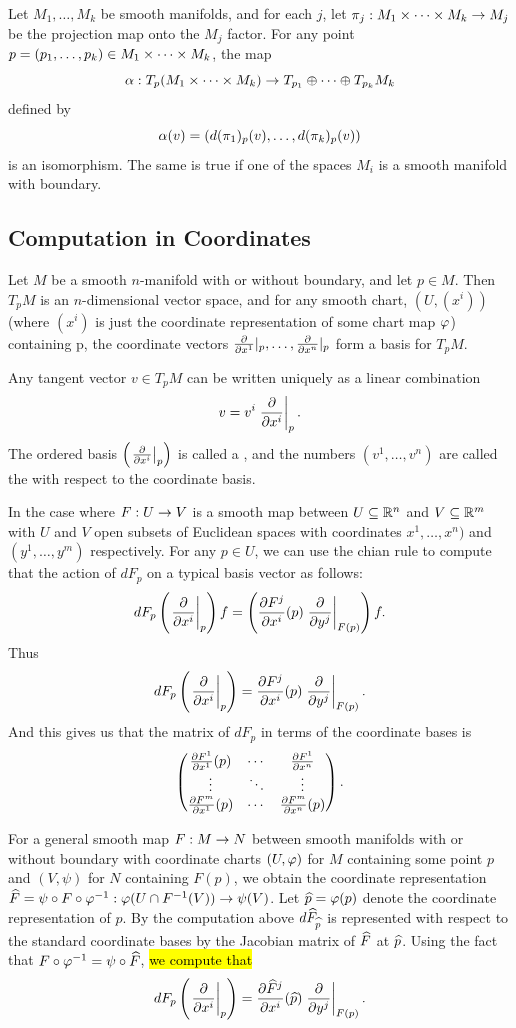 \begin{prop}
Let $M_1,\ldots,M_k$ be smooth manifolds, and for each $j$, let $\pi_j:M_1\times\cdots\times M_k\rightarrow M_j$ be the projection map onto the $M_j$ factor. For any point $p = (p_1,\ldots,p_k)\in M_1\times\cdots\times M_k$, the map
\[\alpha:T_p(M_1\times\cdots\times M_k)\rightarrow T_{p_1} \oplus \cdots \oplus T_{p_k}M_k\]
defined by
\[\alpha(v) = (d(\pi_1)_p(v),\ldots,d(\pi_k)_p(v))\]
is an isomorphism. The same is true if one of the spaces $M_i$ is a smooth manifold with boundary.
\end{prop}

\subsection{Computation in Coordinates}\nl

\begin{prop}
Let $M$ be a smooth $n$-manifold with or without boundary, and let $p\in M$. Then $T_p M$ is an $n$-dimensional vector space, and for any smooth chart, $(U, (x^i))$ (where $(x^i)$ is just the coordinate representation of some chart map $\varphi$) containing p, the coordinate vectors $\frac{\partial}{\partial x^1}|_p,\ldots,\frac{\partial}{\partial x^n}|_p$ form a basis for $T_pM$.
\end{prop}

\dfn Any tangent vector $v\in T_pM$ can be written uniquely as a linear combination
\[v = v^i\left. \frac{\partial}{\partial x^i}\right|_{p}.\]
The ordered basis $\left(\left. \frac{\partial}{\partial x^i}\right|_{p}\right)$ is called a , and the numbers $(v^1,\ldots,v^n)$ are called the  with respect to the coordinate basis.

\dfn In the case where $F:U\rightarrow V$ is a smooth map between $U\subseteq \mathbb{R}^n$ and $V\subseteq \mathbb{R}^m$ with $U$ and $V$ open subsets of Euclidean spaces with coordinates $x^1,\ldots,x^n)$ and $(y^1,\ldots, y^m)$ respectively. For any $p\in U$, we can use the chian rule to compute that the action of $dF_p$ on a typical basis vector as follows:
\[dF_p\left( \left. \frac{\partial}{\partial x^i}\right|_{p}\right) f = \left(\frac{\partial{F^j}}{\partial{x^i}}(p) \left. \frac{\partial}{\partial y^j}\right|_{F(p)}\right) f.\]
Thus
\[dF_p\left( \left. \frac{\partial}{\partial x^i}\right|_{p}\right) = \frac{\partial{F^j}}{\partial{x^i}}(p) \left. \frac{\partial}{\partial y^j}\right|_{F(p)}.\]
And this gives us that the matrix of $dF_p$ in terms of the coordinate bases is
\[\begin{pmatrix} \frac{\partial{F^1}}{\partial{x^1}}(p) & \cdots & \frac{\partial{F^1}}{\partial{x^n}}\\ 
       \vdots & \ddots & \vdots\\
       \frac{\partial{F^m}}{\partial{x^1}}(p) & \cdots & \frac{\partial{F^m}}{\partial{x^n}}(p)\end{pmatrix}.\]

\dfn For a general smooth map $F:M\rightarrow N$ between smooth manifolds with or without boundary with coordinate charts $(U,\varphi)$ for $M$ containing some point $p$ and $(V, \psi)$ for $N$ containing $F(p)$, we obtain the coordinate representation $\widehat F = \psi \circ F \circ \varphi^{-1}:\varphi(U\cap F^{-1}(V))\rightarrow \psi(V)$. Let $\widehat p = \varphi(p)$ denote the coordinate representation of $p$. By the computation above $d\widehat F_{\widehat p}$ is represented with respect to the standard coordinate bases by the Jacobian matrix of $\widehat F$ at $\widehat p$. Using the fact that $F\circ \varphi^{-1} = \psi \circ \widehat F$, \hl{we compute that}
\[dF_p\left(\left. \frac{\partial}{\partial x^i}\right|_{p}\right) = \frac{\partial{\widehat F^j}}{\partial{x^i}}(\widehat p)\left. \frac{\partial}{\partial y^j}\right|_{F(p)}.\]


